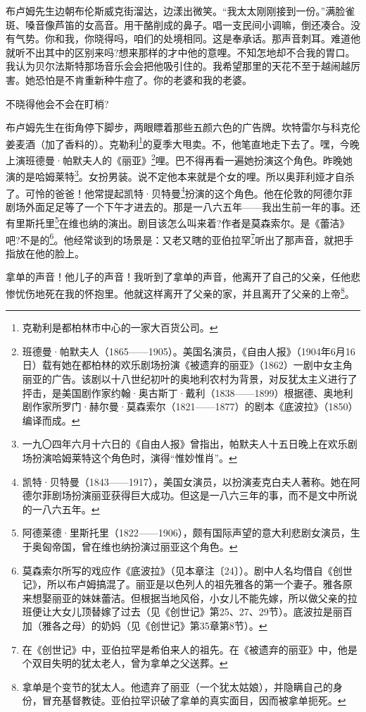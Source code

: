 \par 布卢姆先生边朝布伦斯威克街溜达，边漾出微笑。“我太太刚刚接到一份。”满脸雀斑、嗓音像芦笛的女高音。用干酪削成的鼻子。唱一支民间小调嘛，倒还凑合。没有气势。你和我，你晓得吗，咱们的处境相同。这是奉承话。那声音刺耳。难道他就听不出其中的区别来吗?想来那样的才中他的意哩。不知怎地却不合我的胃口。我认为贝尔法斯特那场音乐会会把他吸引住的。我希望那里的天花不至于越闹越厉害。她恐怕是不肯重新种牛痘了。你的老婆和我的老婆。
\par 不晓得他会不会在盯梢?
\par 布卢姆先生在街角停下脚步，两眼瞟着那些五颜六色的广告牌。坎特雷尔与科克伦姜麦酒（加了香料的）。克勒利\footnote{克勒利是都柏林市中心的一家大百货公司。}的夏季大甩卖。不，他笔直地走下去了。嘿，今晚上演班德曼·帕默夫人的《丽亚》\footnote{班德曼·帕默夫人（1865——1905）。美国名演员，《自由人报》（1904年6月16日）载有她在都柏林的欢乐剧场扮演《被遗弃的丽亚》（1862）一剧中女主角丽亚的广告。该剧以十八世纪初叶的奥地利农村为背景，对反犹太主义进行了抨击，是美国剧作家约翰·奥古斯丁·戴利（1838——1899）根据德、奥地利剧作家所罗门·赫尔曼·莫森索尔（1821——1877）的剧本《底波拉》（1850）编译而成。}哩。巴不得再看一遍她扮演这个角色。昨晚她演的是哈姆莱特\footnote{一九〇四年六月十六日的《自由人报》曾指出，帕默夫人十五日晚上在欢乐剧场扮演哈姆莱特这个角色时，演得“惟妙惟肖”。}。女扮男装。说不定他本来就是个女的哩。所以奥菲利娅才自杀了。可怜的爸爸！他常提起凯特·贝特曼\footnote{凯特·贝特曼（1843——1917），美国女演员，以扮演麦克白夫人著称。她在阿德尔菲剧场扮演丽亚获得巨大成功。但这是一八六三年的事，而不是文中所说的一八六五年。}扮演的这个角色。他在伦敦的阿德尔菲剧场外面足足等了一个下午才进去的。那是一八六五年——我出生前一年的事。还有里斯托里\footnote{阿德莱德·里斯托里（1822——1906），颇有国际声望的意大利悲剧女演员，生于奥匈帝国，曾在维也纳扮演过丽亚这个角色。}在维也纳的演出。剧目该怎么叫来着?作者是莫森索尔。是《蕾洁》吧?不是的\footnote{莫森索尔所写的戏应作《底波拉》（见本章注〔24〕）。剧中人名均借自《创世记》，所以布卢姆搞混了。丽亚是以色列人的祖先雅各的第一个妻子。雅各原来想娶丽亚的妹妹蕾洁。但根据当地风俗，小女儿不能先嫁，所以做父亲的拉班便让大女儿顶替嫁了过去（见《创世记》第25、27、29节）。底波拉是丽百加（雅各之母）的奶妈（见《创世记》第35章第8节）。}。他经常谈到的场景是：又老又瞎的亚伯拉罕\footnote{在《创世记》中，亚伯拉罕是希伯来人的祖先。在《被遗弃的丽亚》中，他是个双目失明的犹太老人，曾为拿单之父送葬。}听出了那声音，就把手指放在他的脸上。
\par 拿单的声音！他儿子的声音！我听到了拿单的声音，他离开了自己的父亲，任他悲惨忧伤地死在我的怀抱里。他就这样离开了父亲的家，并且离开了父亲的上帝\footnote{拿单是个变节的犹太人。他遗弃了丽亚（一个犹太姑娘），并隐瞒自己的身份，冒充基督教徒。亚伯拉罕识破了拿单的真实面目，因而被拿单扼死。}。
